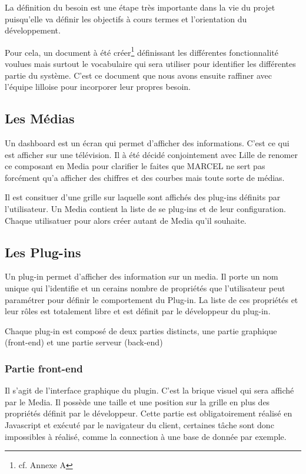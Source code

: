 \label{sec:3.1-besoin}

La définition du besoin est une étape très importante dans la vie du projet puisqu'elle va définir les objectifs à cours termes et l'orientation du développement.

Pour cela, un document à été créer\footnote{cf. Annexe A} définissant les différentes fonctionnalité voulues mais surtout le vocabulaire qui sera utiliser pour identifier les différentes partie du système. C'est ce document que nous avons ensuite raffiner avec l'équipe lilloise pour incorporer leur propres besoin.

\subsection{Les Médias}

  Un dashboard est un écran qui permet d'afficher des informations. C'est ce qui est afficher sur une télévision. Il à été décidé conjointement avec Lille de renomer ce composant en Media pour clarifier le faites que MARCEL ne sert pas forcément qu'a afficher des chiffres et des courbes mais toute sorte de médias.

  Il est consituer d'une grille sur laquelle sont affichés des plug-ins définits par l'utilisateur. Un Media contient la liste de se plug-ins et de leur configuration. Chaque utilisatuer pour alors créer autant de Media qu'il souhaite.

\subsection{Les Plug-ins}

  Un plug-in permet d'afficher des information sur un media. Il porte un nom unique qui l'identifie et un cerains nombre de propriétés que l'utilisateur peut paramétrer pour définir le comportement du Plug-in. La liste de ces propriétés et leur rôles est totalement libre et est définit par le développeur du plug-in.

  Chaque plug-in est composé de deux parties distincts, une partie graphique (front-end) et une partie serveur (back-end)

  \subsubsection{Partie \gls{front-end}}

    Il s'agit de l'interface graphique du plugin. C'est la brique visuel qui sera affiché par le Media. Il possède une taille et une position sur la grille en plus des propriétés définit par le développeur. Cette partie est obligatoirement réalisé en Javascript et exécuté par le navigateur du client, certaines tâche sont donc impossibles à réalisé, comme la connection à une base de donnée par exemple.

